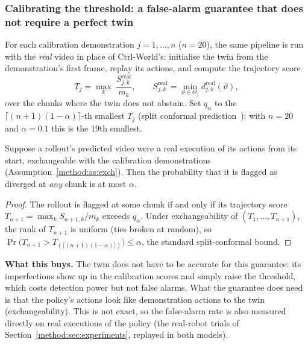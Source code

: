 \subsubsection{Calibrating the threshold: a false-alarm guarantee that does not require a perfect twin}
For each calibration demonstration $j=1,\dots,n$ ($n=20$), the same pipeline is run with the \emph{real} video in place of Ctrl-World's: initialise the twin from the demonstration's first frame, replay its actions, and compute the trajectory score
\begin{equation}
T_j=\max_{k}\ \frac{S^{\mathrm{real}}_{j,k}}{m_k},\qquad S^{\mathrm{real}}_{j,k}=\min_{\vartheta\in\Theta_j}d^{\mathrm{real}}_{j,k}(\vartheta),
\end{equation}
over the chunks where the twin does not abstain. Set $q_\alpha$ to the $\lceil(n+1)(1-\alpha)\rceil$-th smallest $T_j$ (split conformal prediction~\cite{lei2018,angelopoulos}); with $n=20$ and $\alpha=0.1$ this is the 19th smallest.

\begin{proposition}\label{method:prop:conformal}
Suppose a rollout's predicted video were a real execution of its actions from its start, exchangeable with the calibration demonstrations (Assumption~\ref{method:as:exch}). Then the probability that it is flagged as diverged at \emph{any} chunk is at most $\alpha$.
\end{proposition}
\begin{proof}
The rollout is flagged at some chunk if and only if its trajectory score $T_{n+1}=\max_k S_{n+1,k}/m_k$ exceeds $q_\alpha$. Under exchangeability of $(T_1,\dots,T_{n+1})$, the rank of $T_{n+1}$ is uniform (ties broken at random), so $\Pr\big(T_{n+1}>T_{(\lceil(n+1)(1-\alpha)\rceil)}\big)\le\alpha$, the standard split-conformal bound.
\end{proof}
\begin{why}
\textbf{What this buys.} The twin does not have to be accurate for this guarantee: its imperfections show up in the calibration scores and simply raise the threshold, which costs detection power but not false alarms. What the guarantee does need is that the policy's actions look like demonstration actions to the twin (exchangeability). This is not exact, so the false-alarm rate is also measured directly on real executions of the policy (the real-robot trials of Section~\ref{method:sec:experiments}, replayed in both models).
\end{why}

